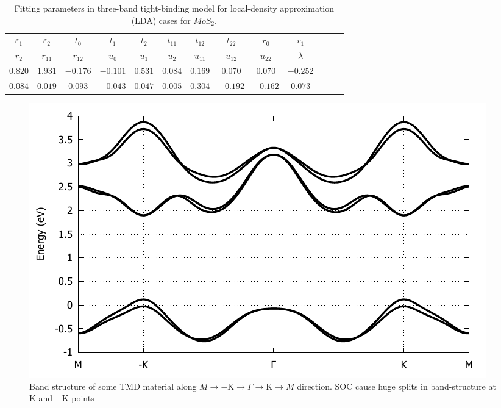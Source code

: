 \documentclass[12pt,english,a4paper]{article}
\begin{document}
\begin{table}[]
	\begin{center}
		\begin{tabular}{c c c c c c c c c c c c c} 
			\hline
			\hline
				$\varepsilon_1$&$\varepsilon_2$&$t_0$&$t_1$&$t_2$&$t_{11}$&$t_{12}$&$t_{22}$&$r_0$&$r_{1}$&\\
				$r_2$&$r_{11}$&$r_{12}$&$u_{0}$&$u_{1}$& $u_{2}$&$u_{11}$&$u_{12}$&$u_{22}$&$\lambda$\\
				\hline
				$0.820$ & $1.931$ & $-0.176$ & $-0.101$ & $0.531$ & $0.084$ & $0.169$ & $0.070$ & $0.070$ & $-0.252$ \\ $0.084$ & $0.019$ & $0.093$ & $-0.043$ & $0.047$ & $0.005$ & $0.304$ & $-0.192$ & $-0.162$ &$0.073$  \\
				\hline
				\hline 
		\end{tabular}
	\caption[Fitting parameters in three-band tight-binding model for $MoS_2$]{Fitting parameters in three-band tight-binding model for local-density approximation (LDA) cases for $MoS_2$.\cite{liu_three-band_2013}}
		\label{3TB Para}
	\end{center}
\end{table}
	\begin{figure}
		\begin{center}
			\includegraphics[width= 0.8\linewidth]{Images/BS.pdf}
\caption[Band structure of $\mathrm{MoS}_2$ material along $M\to -\mathrm{K} \to \Gamma \to \mathrm{K}\to M$ direction]{Band structure of some TMD material along $M\to -\mathrm{K} \to \Gamma \to \mathrm{K}\to M$ direction. SOC cause huge splits in band-structure at $\mathrm{K}$ and $-\mathrm{K}$ points}
			\label{BS}
		\end{center}
	\end{figure}
 	\newpage
\end{document}
